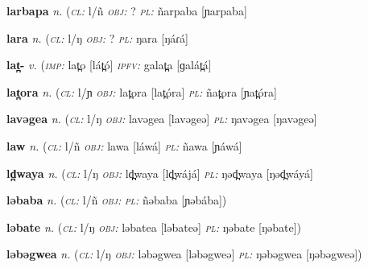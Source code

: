\newentry
\headword\textbf{larbapa} 
\ipa{[larpaba]}
\synpos\textit{n.} 
\class(\textit{\textsc{cl:}} {l/ñ}
\object\textit{\textsc{obj:}} ?
\plural\textit{\textsc{pl:}} ñarpaba [ɲarpaba]

\newentry
\headword\textbf{lara} 
\ipa{[láɾá]}
\synpos\textit{n.} 
\class(\textit{\textsc{cl:}} {l/ŋ}
\object\textit{\textsc{obj:}} ?
\plural\textit{\textsc{pl:}} ŋara [ŋáɾá]

\newentry
\headword\textbf{lat̪-}  
\ipa{[lát̪-]}
\synpos\textit{v.} 
\imperative(\textit {\textsc{imp:}} lat̪o [lát̪ó]  
\imperfective\textit{\textsc{ipfv:}} galat̪a [ɡalát̪á]

\newentry
\headword\textbf{lat̪ora} 
\ipa{[lat̪óra]}
\synpos\textit{n.} 
\class(\textit{\textsc{cl:}} {l/ɲ}
\object\textit{\textsc{obj:}} lat̪ora [lat̪óra]
\plural\textit{\textsc{pl:}} ñat̪ora [ɲat̪óra]

\newentry
\headword\textbf{lavəgea} 
\ipa{[lavəgeə]}
\synpos\textit{n.} 
\class(\textit{\textsc{cl:}} {l/ŋ}
\object\textit{\textsc{obj:}} lavəgea [lavəgeə]
\plural\textit{\textsc{pl:}} ŋavəgea [ŋavəgeə]

\newentry
\headword\textbf{law} 
\ipa{[láw]}
\synpos\textit{n.} 
\class(\textit{\textsc{cl:}} {l/ñ}
\object\textit{\textsc{obj:}} lawa [láwá]
\plural\textit{\textsc{pl:}} ñawa [ɲáwá]

\newentry
\headword\textbf{ld̪waya} 
\ipa{[ld̪wájá]}
\synpos\textit{n.} 
\class(\textit{\textsc{cl:}} {l/ŋ}
\object\textit{\textsc{obj:}} ld̪̪waya [ld̪wájá]
\plural\textit{\textsc{pl:}} ŋəd̪waya [ŋəd̪wáyá]


\newentry
\headword\textbf{ləbaba} %
\ipa{[ləbába]}
\synpos\textit{n.} 
\class(\textit{\textsc{cl:}} {l/ñ}
\object\textit{\textsc{obj:}}
\plural\textit{\textsc{pl:}} ñəbaba [ɲəbába])

\newentry
\headword\textbf{ləbate}  
\ipa{[ləbate]}
\synpos\textit{n.} 
\class(\textit{\textsc{cl:}} {l/ŋ}
\object\textit{\textsc{obj:}} ləbatea [ləbateə]
\plural\textit{\textsc{pl:}} ŋəbate [ŋəbate])

\newentry
\headword\textbf{ləbəgwea}  
\ipa{[ləbəgweə]}
\synpos\textit{n.} 
\class(\textit{\textsc{cl:}} {l/ŋ}
\object\textit{\textsc{obj:}} ləbəgwea [ləbəgweə]
\plural\textit{\textsc{pl:}} ŋəbəgwea [ŋəbəgweə])

